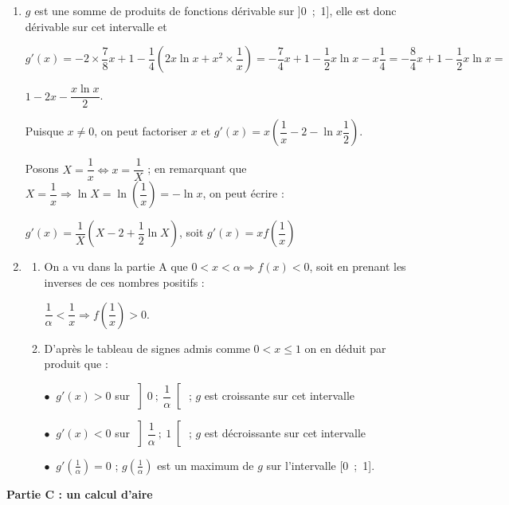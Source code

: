 \documentclass[10pt]{article}
\begin{document}
\begin{enumerate}
\item $g$ est une somme de produits de fonctions dérivable sur ]0~;~1], elle est donc dérivable sur cet intervalle et 

$g'(x) = - 2 \times \dfrac78 x + 1 - \dfrac14\left(2x \ln x + x^2 \times \dfrac 1x \right) = 
- \dfrac74 x + 1 - \dfrac12 x \ln x - x\dfrac14 = - \dfrac84 x + 1 - \dfrac 1 2 x \ln x =$

$  1 - 2x - \dfrac{x\ln x}{2}$.

Puisque $x \ne 0$, on peut factoriser $x$ et $g'(x) = x\left(\dfrac 1x - 2 - \ln x\dfrac12 \right)$.

Posons $X = \dfrac 1x \iff x = \dfrac 1X$ ; en remarquant que $X = \dfrac 1x \Rightarrow \ln X = \ln \left(\dfrac 1x\right) = - \ln x$, on peut écrire :

$g'(x) = \dfrac 1X \left(X - 2 + \dfrac12 \ln X \right)$, soit $g'(x) = xf\left(\dfrac 1x \right)$
\item 
	\begin{enumerate}
		\item On a vu dans la partie A que $0 < x < \alpha \Rightarrow f(x) < 0$, soit en prenant les inverses de ces nombres positifs :
		
$ \dfrac{1}{\alpha} <  \dfrac 1x \Rightarrow f\left(\dfrac 1x \right) > 0$.
		\item D'après le tableau de signes admis comme $0< x \leqslant 1$ on en déduit par produit que :
		
$\bullet~$ $g'(x) > 0$ sur $\left]0~;~\dfrac{1}{\alpha}\right[$ ; $g$ est croissante sur cet intervalle

$\bullet~$ $g'(x) < 0$ sur $\left]\dfrac{1}{\alpha}~;~1\right[$ ; $g$ est décroissante sur cet intervalle

$\bullet~$ $g'\left(\frac{1}{\alpha}\right) = 0$ ; $g\left(\frac{1}{\alpha}\right)$ est un maximum de $g$ sur l'intervalle [0~;~1].
	\end{enumerate}
\end{enumerate}

\medskip

\textbf{Partie C : un calcul d'aire}

\medskip
\end{document}

